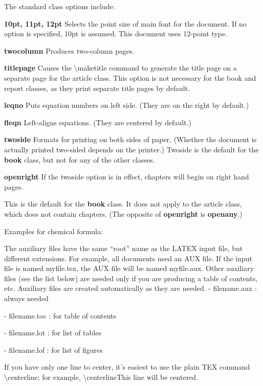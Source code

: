 \documentclass[a4paper,11pt,UTF8,openright]{book}
\begin{document}
The standard class options include:

\textbf{10pt, 11pt, 12pt} Selects the point size of main font for the document. If no option is specified, 10pt is assumed. This document uses 12-point type.

\textbf{twocolumn} Produces two-column pages.

\textbf{titlepage} Causes the \textbackslash maketitle command to generate the title page on a separate page for the article class. This option is not necessary for the book and report
classes, as they print separate title pages by default.

\textbf{leqno} Puts equation numbers on left side. (They are on the right by default.)

\textbf{fleqn} Left-aligns equations. (They are centered by default.)

\textbf{twoside} Formats for printing on both sides of paper. (Whether the document is actually printed two-sided depends on the printer.) Twoside is the default for the \textbf{book} class, but not for any of the other classes.

\textbf{openright} If the twoside option is in effect, chapters will begin on right hand pages.

This is the default for the \textbf{book} class. It does not apply to the article class,
which does not contain chapters. (The opposite of \textbf{openright} is \textbf{openany}.)


\noindent Examples for chemical formula:
\vskip 0.1in



\vskip 0.1in
The auxiliary files have the same “root” name as the LATEX input file, but different
extensions. For example, all documents need an AUX file. If the input file is named
myfile.tex, the AUX file will be named myfile.aux. Other auxiliary files (see the list
below) are needed only if you are producing a table of contents, etc. Auxiliary files are
created automatically as they are needed.
\vskip 0.1in
- filename.aux : always needed

- filename.toc : for table of contents

- filename.lot : for list of tables

- filename.lof : for list of figures

\vskip 0.1in
If you have only one line to center, it’s easiest to use the plain TEX command
\textbackslash centerline; for example,
\textbackslash centerline{This line will be centered}.
\end{document}
